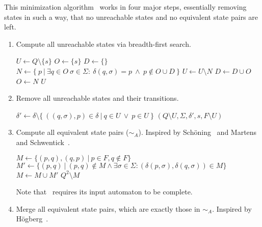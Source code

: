 This minimization algorithm \MinAlg\ works in four major steps, essentially removing states in such a way, that no unreachable states and no equivalent state pairs are left.
\begin{enumerate}
	\item Compute all unreachable states via breadth-first search.
	
	\vspace{0.2cm}
	\begin{algorithmic}[1]
			\State $U \gets Q \setminus \{s\}$	
			\State $O \gets \{s\}$				
			\State $D \gets \{\}$				
				\State $N \gets \{\ p\ | \ \exists q \in O\ \sigma \in \Sigma \colon\ \delta(q, \sigma) = p\ \land\ p \notin O \cup D\ \}$
				\State $U \gets U \setminus N$
				\State $D \gets D \cup O$
				\State $O \gets N$
			\EndWhile
			\State \Return $U$
		\EndFunction
	\end{algorithmic}

	\item Remove all unreachable states and their transitions.
	
	\vspace{0.2cm}
	\begin{algorithmic}[1]
            \State $\delta' \gets \delta \setminus \{\ ((q,\sigma),p)\in\delta\ |\ q\in U\ \lor\ p\in U\ \}$
			\State \Return $(Q \setminus U, \Sigma, \delta', s, F \setminus U)$
		\EndFunction
	\end{algorithmic}

	\item Compute all equivalent state pairs ($\sim_A$). Inspired by Schöning~\cite[p. 46]{Sch01} and Martens and Schwentick~\cite[p. 17]{MS18}.
	\vspace{0.2cm}
	\begin{algorithmic}[1]
		 \label{ch:2:minmark}
		\State $M \gets \{ (p,q), (q,p)\ |\ p \in F, q \notin F \}$
		\Do
			\State $M' \gets \{ (p,q)\ |\ (p,q) \notin M \land \exists \sigma \in \Sigma \colon (\delta(p,\sigma), \delta(q,\sigma)) \in M \}$
			\State $M \gets M \cup M'$
		\State \Return $Q^2 \setminus M$
		\EndFunction
	\end{algorithmic}
	Note that \CompDist\ requires its input automaton to be complete. 

	\item Merge all equivalent state pairs, which are exactly those in $\sim_A$. Inspired by Högberg~\cite[p. 10]{HL20}.
	

\end{enumerate}

